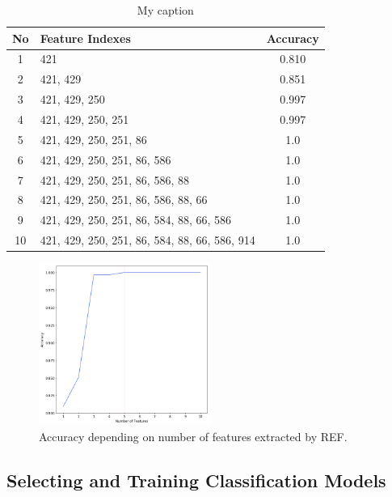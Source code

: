 \documentclass[11pt]{article}
\begin{document}
		\begin{center}
		  	\begin{table}
		  	\centering
			\begin{tabular}[b]{|c | l | c|}
				 \hline
				 No & Feature Indexes 	  						    & Accuracy \\ 
				 \hline
				 1 & 421 											& 0.810 \\ 
				 2 & 421, 429 										& 0.851 \\ 
				 3 & 421, 429, 250 									& 0.997 \\ 
				 4 & 421, 429, 250, 251 							& 0.997 \\ 
				 5 & 421, 429, 250, 251, 86 						& 1.0 	\\ 
				 6 & 421, 429, 250, 251, 86, 586 					& 1.0 	\\ 
				 7 & 421, 429, 250, 251, 86, 586, 88 				& 1.0 	\\ 
				 8 & 421, 429, 250, 251, 86, 586, 88, 66 			& 1.0 	\\ 
				 9 & 421, 429, 250, 251, 86, 584, 88, 66, 586 		& 1.0 	\\ 
				 10 & 421, 429, 250, 251, 86, 584, 88, 66, 586, 914 & 1.0 	\\ 
				 \hline
			\end{tabular}
			\caption{My caption}
			\label{tbl:accuracy_table}
			\end{table}
		\end{center}

		\begin{figure}[h]
			\centering
			\includegraphics[width=0.5\textwidth]{png/ref_multi}
			\caption{Accuracy depending on number of features extracted by REF.}
			\label{fig:ref_multi}
		\end{figure}
		\subsection{Selecting and Training Classification Models}
\end{document}
